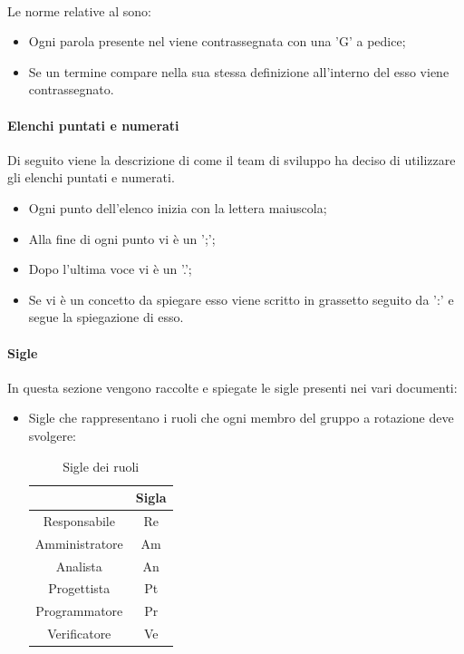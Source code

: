 \paragraph{\docNameGlo}
Le norme relative al \docNameGloLow{} sono:
\begin{itemize}
    \item Ogni parola presente nel \docNameGloLow{} viene contrassegnata con una 'G' a pedice;
    \item Se un termine compare nella sua stessa definizione all'interno del \docNameGloLow{} esso viene contrassegnato.
\end{itemize}

\paragraph{Elenchi puntati e numerati}
Di seguito viene la descrizione di come il team di sviluppo ha deciso di utilizzare gli elenchi puntati e numerati.
\begin {itemize}
    \item Ogni punto dell'elenco inizia con la lettera maiuscola;
    \item Alla fine di ogni punto vi è un ';';
    \item Dopo l'ultima voce vi è un '.';
    \item Se vi è un concetto da spiegare esso viene scritto in grassetto seguito da ':' e segue la spiegazione di esso.
\end {itemize}
\paragraph{Sigle}
In questa sezione vengono raccolte e spiegate le sigle presenti nei vari documenti:
\begin{itemize}
    \item Sigle che rappresentano i ruoli che ogni membro del gruppo a rotazione deve svolgere:
    \begin{table}[H]
        \centering
        \renewcommand{\arraystretch}{1.8}
        \begin{tabular}{c|c}
          \rowcolor[HTML]{125E28} 
          \multicolumn{1}{c}{\color[HTML]{FFFFFF}\textbf{Ruolo}}
          & \multicolumn{1}{c}{\color[HTML]{FFFFFF}\textbf{Sigla}}\\
          \hline
          Responsabile      & Re\\
          Amministratore    & Am\\
          Analista          & An\\
          Progettista       & Pt\\
          Programmatore     & Pr\\
          Verificatore      & Ve
        \end{tabular}
        \caption{Sigle dei ruoli}
      \end{table}
\end{itemize}
